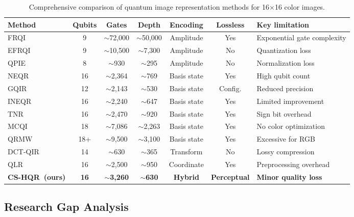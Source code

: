 \documentclass{ipol}
\newcommand{\cshqr}{\textsc{CS-HQR}}
\begin{document}
\begin{table}[H]
\begin{center}
\small
\begin{tabular}{lcccccp{2.5cm}}
\hline
Method & Qubits & Gates & Depth & Encoding & Lossless & Key limitation \\
\hline
FRQI~\cite{ref3} & 9 & $\sim$72,000 & $\sim$50,000 & Amplitude & Yes
  & Exponential gate complexity \\
EFRQI~\cite{ref32}& 9 & $\sim$10,500 & $\sim$7,300 & Amplitude & No
  & Quantization loss \\
QPIE~\cite{ref24} & 8 & $\sim$930 & $\sim$295 & Amplitude & No
  & Normalization loss \\
NEQR~\cite{ref4}  & 16 & $\sim$2,364 & $\sim$769 & Basis state & Yes
  & High qubit count \\
GQIR~\cite{ref18} & 12 & $\sim$2,143 & $\sim$530 & Basis state & Config.
  & Reduced precision \\
INEQR~\cite{ref33}& 16 & $\sim$2,240 & $\sim$647 & Basis state & Yes
  & Limited improvement \\
TNR~\cite{ref41}  & 16 & $\sim$2,470 & $\sim$920 & Basis state & Yes
  & Sign bit overhead \\
MCQI~\cite{ref8}  & 18 & $\sim$7,086 & $\sim$2,263 & Basis state & Yes
  & No color optimization \\
QRMW~\cite{ref34} & 18+ & $\sim$9,500 & $\sim$3,100 & Basis state & Yes
  & Excessive for RGB \\
DCT-QIR~\cite{ref25} & 14 & $\sim$630 & $\sim$365 & Transform & No
  & Lossy compression \\
QLR~\cite{ref19}  & 16 & $\sim$2,500 & $\sim$950 & Coordinate & Yes
  & Preprocessing overhead \\
\hline
\textbf{\cshqr\ (ours)} & \textbf{16} & $\sim$\textbf{3,260} &
  $\sim$\textbf{630} & \textbf{Hybrid} & \textbf{Perceptual} &
  \textbf{Minor quality loss} \\
\hline
\end{tabular}
\caption{Comprehensive comparison of quantum image representation methods
for 16$\times$16 color images.}
\label{tab:method_comparison}
\end{center}
\end{table}

\FloatBarrier
\subsection{Research Gap Analysis}
\end{document}
